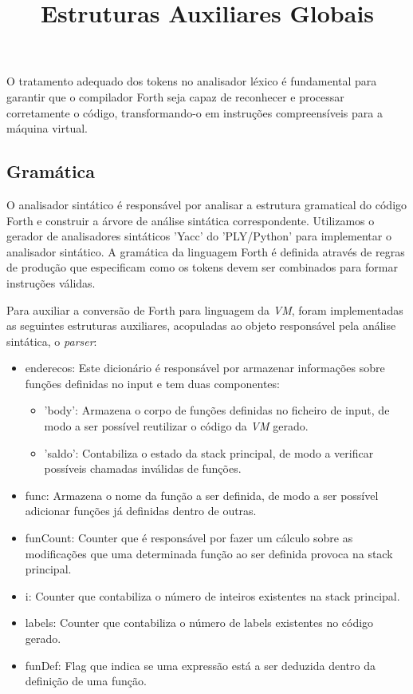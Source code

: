 \documentclass{predef}
\begin{document}
O tratamento adequado dos tokens no analisador léxico é fundamental para garantir que o compilador Forth seja capaz de reconhecer e processar corretamente o código, transformando-o em instruções compreensíveis para a máquina virtual.


\subsection{Gramática}
O analisador sintático é responsável por analisar a estrutura gramatical do código Forth e construir a árvore de análise sintática correspondente. Utilizamos o gerador de analisadores sintáticos 'Yacc' do 'PLY/Python' para implementar o analisador sintático. A gramática da linguagem Forth é definida através de regras de produção que especificam como os tokens devem ser combinados para formar instruções válidas.
\\
\title{Estruturas Auxiliares Globais}
Para auxiliar a conversão de Forth para linguagem da \textit{VM}, foram implementadas as seguintes estruturas auxiliares, acopuladas ao objeto responsável pela análise sintática, o \textit{parser}:
\begin{itemize}
    \item enderecos: Este dicionário é responsável por armazenar informações sobre funções definidas no input e tem duas componentes:
    \begin{itemize}
        \item 'body': Armazena o corpo de funções definidas no ficheiro de input, de modo a ser possível reutilizar o código da \textit{VM} gerado.
        \item 'saldo': Contabiliza o estado da stack principal, de modo a verificar possíveis chamadas inválidas de funções.
    \end{itemize}
    \item func: Armazena o nome da função a ser definida, de modo a ser possível adicionar funções já definidas dentro de outras.
    \item funCount: Counter que é responsável por fazer um cálculo sobre as modificações que uma determinada função ao ser definida provoca na stack principal.
    \item i: Counter que contabiliza o número de inteiros existentes na stack principal.
    \item labels: Counter que contabiliza o número de labels existentes no código gerado.
    \item funDef: Flag que indica se uma expressão está a ser deduzida dentro da definição de uma função.
\end{itemize}
\end{document}
